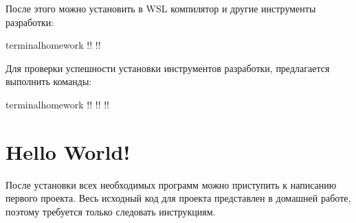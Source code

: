 \documentclass[14pt]{extarticle}
\begin{document}
После этого можно установить в WSL компилятор и другие инструменты разработки:

\begin{terminalwindow}{terminalhomework}
!!
!!
\end{terminalwindow}

Для проверки успешности установки инструментов разработки, предлагается выполнить команды:

\begin{terminalwindow}{terminalhomework}
!!
!!
!!
\end{terminalwindow}

\section{Hello World!}

После установки всех необходимых программ можно приступить к написанию первого проекта.
Весь исходный код для проекта представлен в домашней работе, поэтому требуется только следовать
инструкциям.
\end{document}
